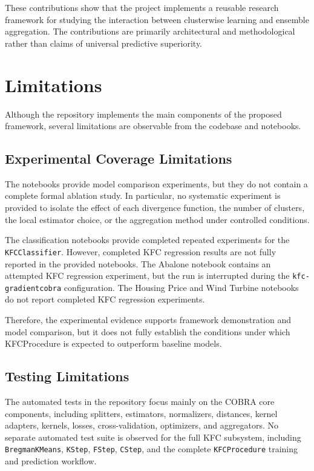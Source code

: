 These contributions show that the project implements a reusable research framework for studying the interaction between clusterwise learning and ensemble aggregation. The contributions are primarily architectural and methodological rather than claims of universal predictive superiority.

\section{Limitations}
\label{sec:limitations}

Although the repository implements the main components of the proposed framework, several limitations are observable from the codebase and notebooks.

\subsection{Experimental Coverage Limitations}

The notebooks provide model comparison experiments, but they do not contain a complete formal ablation study. In particular, no systematic experiment is provided to isolate the effect of each divergence function, the number of clusters, the local estimator choice, or the aggregation method under controlled conditions.

The classification notebooks provide completed repeated experiments for the \texttt{KFCClassifier}. However, completed KFC regression results are not fully reported in the provided notebooks. The Abalone notebook contains an attempted KFC regression experiment, but the run is interrupted during the \texttt{kfc-gradientcobra} configuration. The Housing Price and Wind Turbine notebooks do not report completed KFC regression experiments.

Therefore, the experimental evidence supports framework demonstration and model comparison, but it does not fully establish the conditions under which KFCProcedure is expected to outperform baseline models.

\subsection{Testing Limitations}

The automated tests in the repository focus mainly on the COBRA core components, including splitters, estimators, normalizers, distances, kernel adapters, kernels, losses, cross-validation, optimizers, and aggregators. No separate automated test suite is observed for the full KFC subsystem, including \texttt{BregmanKMeans}, \texttt{KStep}, \texttt{FStep}, \texttt{CStep}, and the complete \texttt{KFCProcedure} training and prediction workflow.

